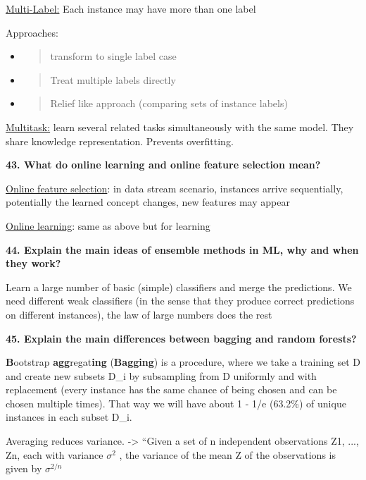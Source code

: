 \underline{Multi-Label:} Each instance may have more than one label

Approaches:

\begin{itemize}
\item
  \begin{quote}
  transform to single label case
  \end{quote}
\item
  \begin{quote}
  Treat multiple labels directly
  \end{quote}
\item
  \begin{quote}
  Relief like approach (comparing sets of instance labels)
  \end{quote}
\end{itemize}

\underline{Multitask:} learn several related tasks simultaneously with
the same model. They share knowledge representation. Prevents
overfitting.

\textbf{43. What do online learning and online feature selection mean?}

\underline{Online feature selection}: in data stream scenario, instances
arrive sequentially, potentially the learned concept changes, new
features may appear

\underline{Online learning}: same as above but for learning

\textbf{44. Explain the main ideas of ensemble methods in ML, why and
when they work?}

Learn a large number of basic (simple) classifiers and merge the
predictions. We need different weak classifiers (in the sense that they
produce correct predictions on different instances), the law of large
numbers does the rest

\textbf{45. Explain the main differences between bagging and random
forests?}

\textbf{B}ootstrap \textbf{agg}regat\textbf{ing} (\textbf{Bagging}) is a
procedure, where we take a training set D and create new subsets D\_i by
subsampling from D uniformly and with replacement (every instance has
the same chance of being chosen and can be chosen multiple times). That
way we will have about 1 - 1/e (63.2\%) of unique instances in each
subset D\_i.

Averaging reduces variance. -\textgreater{} ``Given a set of n
independent observations Z1, ..., Zn, each with variance $\sigma^2$ , the
variance of the mean Z of the observations is given by
$\sigma^{2/n}$

